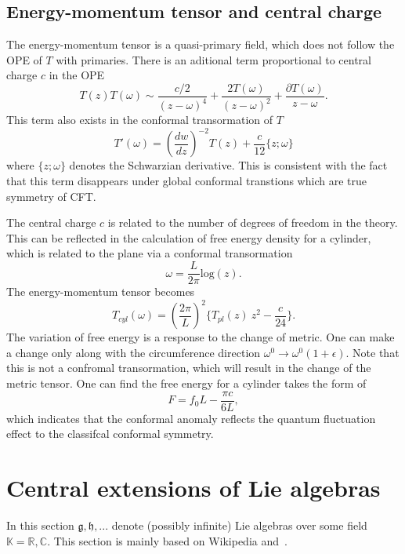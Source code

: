 \documentclass[submission, PhysLectNotes]{SciPost}
\begin{document}
\subsection{Energy-momentum tensor and central charge}
The energy-momentum tensor is a quasi-primary field, which does not follow the OPE of $T$ with primaries. There is an aditional term proportional to central charge $c$ in the OPE
\begin{equation}
T(z)T(\omega) \sim \frac{c/2}{\left(z-\omega\right)^4} + \frac{2 T(\omega)}{\left(z-\omega\right)^2} + \frac{\partial T(\omega)}{z-\omega}.
\end{equation}
This term also exists in the conformal transormation of $T$
\begin{equation}
T'(\omega) = \left(\frac{dw}{dz}\right)^{-2} T(z) + \frac{c}{12}\{z;\omega\}
\end{equation}
where $\{z;\omega\}$ denotes the Schwarzian derivative. This is consistent with the fact that this term disappears under global conformal transtions which are true symmetry of CFT. 

The central charge $c$ is related to the number of degrees of freedom in the theory. This can be reflected in the calculation of free energy density for a cylinder, which is related to the plane via a conformal transormation
\begin{equation}
\omega = \frac{L}{2\pi} \mathrm{log} (z).
\end{equation}
The energy-momentum tensor becomes 
\begin{equation}
T_{cyl}(\omega) = \left(\frac{2\pi}{L}\right)^2 \{T_{pl}(z)\ z^2 - \frac{c}{24}\}.
\end{equation}
The variation of free energy is a response to the change of metric. One can make a change only along with the circumference direction $\omega^0 \rightarrow \omega^0(1+\epsilon)$. Note that this is not a confromal transormation, which will result in the change of the metric tensor. One can find the free energy for a cylinder takes the form of
\begin{equation}
F = f_0 L - \frac{\pi c}{6L},
\end{equation}
which indicates that the conformal anomaly reflects the quantum fluctuation effect to the classifcal conformal symmetry.   


\appendix

\section{Central extensions of Lie algebras}
In this section $\mathfrak{g},\mathfrak{h},...$ denote (possibly infinite) Lie algebras over some field $\mathbb{K} = \mathbb{R}, \mathbb{C}$. This section is mainly based on Wikipedia and~\cite{Schottenloher}.
\end{document}
